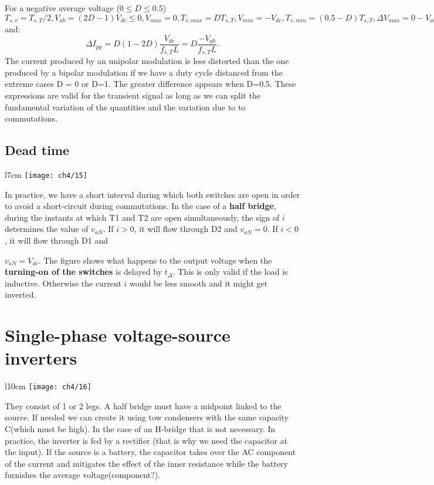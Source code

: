 		For a negative average voltage ($0\leq D\leq 0.5$) $T_{s,v} = T_{s,T}/2, V_{ab} =(2D-1)V_{dc}\leq 0, V_{max}=0, T_{v,max}=DT_{s,T}, V_{min}=-V_{dc}, T_{v,min}= (0.5-D)T_{s,T}, \Delta V_{max}= 0-V_{ab}=(1-2D)V_{dc}$ and:
		\begin{equation}
			\Delta I_{pp} = D(1-2D)\frac{V_{dc}}{f_{s,T}L} = D\frac{-V_{ab}}{f_{s,T}L}.
		\end{equation}
		The current produced by an unipolar modulation is less distorted than the one produced by a bipolar modulation if we have a duty cycle distanced from the extreme cases D = 0 or D=1. The greater difference appears when D=0.5. These expressions are valid for the transient signal as long as we can split the fundamental variation of the quantities and the variation due to to commutations.
		
	\subsection{Dead time}
		\begin{wrapfigure}[7]{l}{7cm}
		\vspace{-5mm}
		\texttt{[image: ch4/15]}
		\end{wrapfigure}
		In practice, we have a short interval during which both switches are open in order to avoid a short-circuit during commutations. In the case of a \textbf{half bridge}, during the instants at which T1 and T2 are open simultaneously, the sign of $i$ determines the value of $v_{aN}$. If $i>0$, it will flow through D2 and $v_{aN} =0$. If $i<0$, it will flow through D1 and
		
		\newpage $v_{aN} = V_{dc}$. The figure shows what happens to the output voltage when the \textbf{turning-on of the switches} is delayed by $t_{\Delta}$. This is only valid if the load is inductive. Otherwise the current $i$ would be less smooth and it might get inverted. 
		
\section{Single-phase voltage-source inverters}
	\begin{wrapfigure}[10]{l}{10cm}
	\vspace{-5mm}
	\texttt{[image: ch4/16]}
	\end{wrapfigure}
	They consist of 1 or 2 legs. A half bridge must have a midpoint linked to the source. If needed we can create it using tow condensers with the same capacity C(which must be high). In the case of an H-bridge that is not necessary. In practice, the inverter is fed by a rectifier (that is why we need the capacitor at the input). If the source is a battery, the capacitor takes over the AC component of the current and mitigates the effect of the inner resistance while the battery furnishes the average voltage(component?).
	
